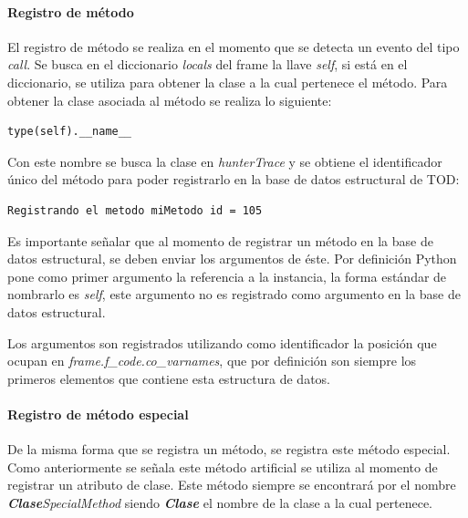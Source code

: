 \documentclass[12pt,legalpaper]{report}
\begin{document}
				\paragraph{Registro de método}

El registro de método se realiza en el momento que se detecta un evento del tipo \textit{call}.  Se busca en el diccionario \textit{locals} del frame la llave \textit{self}, si está en el diccionario, se utiliza para obtener la clase a la cual pertenece el método.  Para obtener la clase asociada al método se realiza lo siguiente:

\begin{singlespace}
\begin{lstlisting}[style=consola,numbers=none]
type(self).__name__
\end{lstlisting}
\end{singlespace}


Con este nombre se busca la clase en \textit{hunterTrace} y se obtiene el identificador único del método para poder registrarlo en la base de datos estructural de TOD:

\begin{singlespace}
\begin{lstlisting}[style=consola,numbers=none]
Registrando el metodo miMetodo id = 105
\end{lstlisting}
\end{singlespace}

Es importante señalar que al momento de registrar un método en la base de datos estructural, se deben enviar los argumentos de éste.  Por definición Python pone como primer argumento la referencia a la instancia, la forma estándar de nombrarlo es \textit{self}, este argumento no es registrado como argumento en la base de datos estructural.

Los argumentos son registrados utilizando como identificador la posición que ocupan en \textit{frame.f\_code.co\_varnames}, que por definición son siempre los primeros elementos que contiene esta estructura de datos.

				\paragraph{Registro de método especial}

De la misma forma que se registra un método, se registra este método especial.  Como anteriormente se señala este método artificial se utiliza al momento de registrar un atributo de clase.  Este método siempre se encontrará por el nombre \textit{\textbf{Clase}SpecialMethod} siendo \textit{\textbf{Clase}} el nombre de la clase a la cual pertenece.
\end{document}
